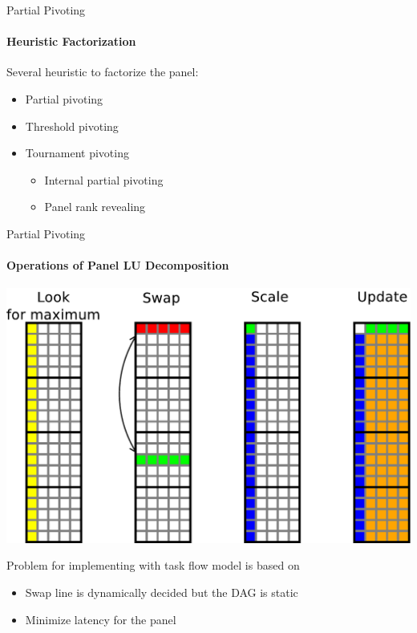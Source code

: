 \begin{frame}{Partial Pivoting}
\framesubtitle{Heuristic Factorization}
Several heuristic to factorize the panel:
\begin{itemize}
\item Partial pivoting
\item Threshold pivoting
\item Tournament pivoting
\begin{itemize}
\item Internal partial pivoting
\item Panel rank revealing
\end{itemize}
\end{itemize}
\end{frame}


\begin{frame}{Partial Pivoting}
\framesubtitle{Operations of Panel LU Decomposition}
\begin{center}
\includegraphics[scale=0.3]{panel_operation.pdf}
\end{center}
\pause
\begin{exampleblock}{Problem for implementing with task flow model is based on}
\begin{itemize}
\item Swap line is dynamically decided but the DAG is static
\item Minimize latency for the panel
\end{itemize}
\end{exampleblock}{}
\end{frame}



